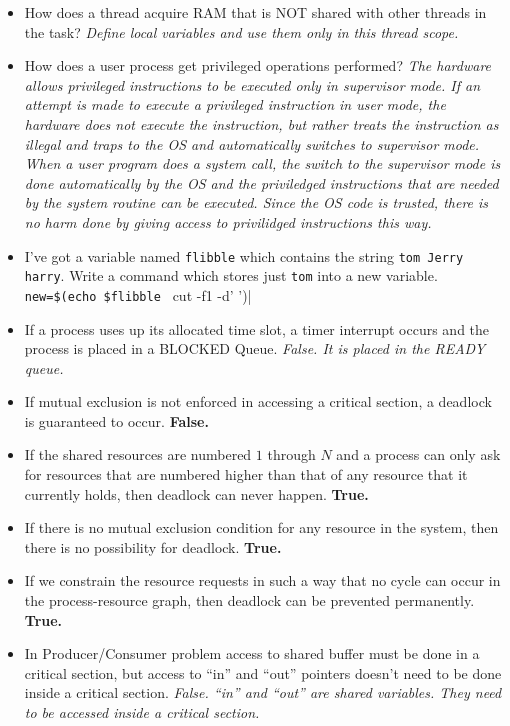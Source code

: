 \documentclass[10pt,landscape]{article}
\begin{document}
\begin{multicols}{4}
\begin{itemize}
    \item How does a thread acquire RAM that is NOT shared with other threads in the task?  \textit{Define local variables and use them only in this thread scope.}
    \item How does a user process get privileged operations performed? \textit{The hardware allows privileged instructions to be executed only in supervisor mode. If an attempt is made to execute a privileged instruction in user mode, the hardware does not execute the instruction, but rather treats the instruction as illegal and traps to the OS and automatically switches to supervisor mode. When a user program does a system call, the switch to the supervisor mode is done automatically by the OS and the priviledged instructions that are needed by the system routine can be executed. Since the OS code is trusted, there is no harm done by giving access to privilidged instructions this way.}
    \item I've got a variable named \verb$flibble$ which contains the string \verb$tom Jerry harry$. Write a command which stores just \verb$tom$ into a new variable. \verb|new=$(echo $flibble | cut -f1 -d' ')|
    \item If a process uses up its allocated time slot, a timer interrupt occurs and the process is placed in a BLOCKED Queue.  \textit{False. It is placed in the READY queue.}
    \item If mutual exclusion is not enforced in accessing a critical section, a deadlock is guaranteed to occur. \textbf{False.}
    \item If the shared resources are numbered $1$ through $N$ and a process can only ask for resources that are numbered higher than that of any resource that it currently holds, then deadlock can never happen. \textbf{True.}
    \item If there is no mutual exclusion condition for any resource in the system, then there is no possibility for deadlock. \textbf{True.}
    \item If we constrain the resource requests in such a way that no cycle can occur in the process-resource graph, then deadlock can be prevented permanently. \textbf{True.}
    \item In Producer/Consumer problem access to shared buffer must be done in a critical section, but access to ``in'' and ``out'' pointers doesn't need to be done inside a critical section.  \textit{False. ``in'' and ``out'' are shared variables. They need to be accessed inside a critical section.}

\end{itemize}
\end{multicols}
\end{document}
